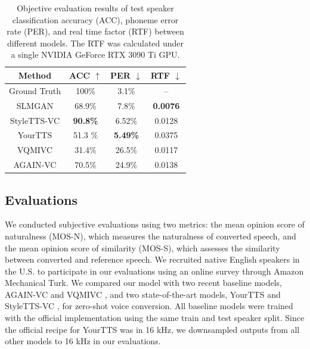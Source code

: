 \documentclass{article}
\begin{document}
\begin{sloppy}
\begin{table}[!t]
\end{table}

\begin{table}[!th]
\vspace{-0.2cm} 
	\centering
	\caption{Objective evaluation results of test speaker classification accuracy (ACC), phoneme error rate (PER), and real time factor (RTF) between different models. The RTF was calculated under a single NVIDIA GeForce RTX 3090 Ti GPU.\\ } 
    \begin{tabular}{c|c|c|c}
    \hline
    Method & ACC $\uparrow$ & PER $\downarrow$ & RTF $\downarrow$  \\
    \hline
    Ground Truth      & 100\% & 3.1\% & -- \\
    \hline
    SLMGAN   & {68.9\%}  & {7.8\%} & \textbf{0.0076} \\
    StyleTTS-VC   & \textbf{90.8\%}  & {6.52\%} & 0.0128\\
    YourTTS & 51.3 \% & \textbf{5.49\%}   & 0.0375 \\
    VQMIVC & 31.4\% & 26.5\% & {0.0117}\\
    AGAIN-VC & 70.5\% & 24.9\% & 0.0138\\

    \hline
    \end{tabular}
    \label{tab:t2}
    \vspace{-0.3cm} 

\end{table}

\subsection{Evaluations}
\label{section3.3}
We conducted subjective evaluations using two metrics: the mean opinion score of naturalness (MOS-N), which measures the naturalness of converted speech, and the mean opinion score of similarity (MOS-S), which assesses the similarity between converted and reference speech. We recruited native English speakers in the U.S. to participate in our evaluations using an online survey through Amazon Mechanical Turk. We compared our model with two recent baseline models, AGAIN-VC \cite{chen2021again} and VQMIVC \cite{wang2021vqmivc}, and two state-of-the-art models, YourTTS\cite{casanova2022yourtts} and StyleTTS-VC \cite{li2023styletts}, for zero-shot voice conversion. All baseline models were trained with the official implementation 
using the same train and test speaker split. Since the official recipe for YourTTS was in 16 kHz, we downsampled outputs from all other models to 16 kHz in our evaluations.


\end{sloppy}
\end{document}
